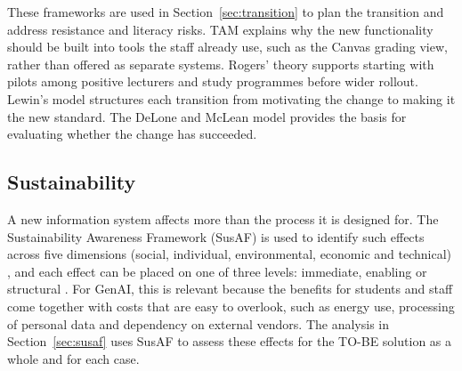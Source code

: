 These frameworks are used in Section~\ref{sec:transition} to plan the transition and address resistance and literacy risks. TAM explains why the new functionality should be built into tools the staff already use, such as the Canvas grading view, rather than offered as separate systems. Rogers' theory supports starting with pilots among positive lecturers and study programmes before wider rollout. Lewin's model structures each transition from motivating the change to making it the new standard. The DeLone and McLean model provides the basis for evaluating whether the change has succeeded.

\subsection{Sustainability}\label{sec:sustainability}

A new information system affects more than the process it is designed for. The Sustainability Awareness Framework (SusAF) is used to identify such effects across five dimensions (social, individual, environmental, economic and technical) \parencite{duboc2020}, and each effect can be placed on one of three levels: immediate, enabling or structural \parencite{becker2016}. For GenAI, this is relevant because the benefits for students and staff come together with costs that are easy to overlook, such as energy use, processing of personal data and dependency on external vendors. The analysis in Section~\ref{sec:susaf} uses SusAF to assess these effects for the TO-BE solution as a whole and for each case.